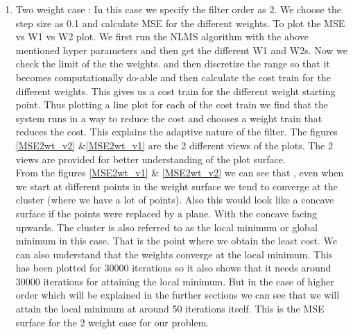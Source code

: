 \documentclass[conference]{IEEEtran}
\begin{document}
\begin{enumerate} 


\begin{figure*}
\centering
\texttt{[image: MSEPlotFor2WeightCase\_View1.jpg]}
\caption{MSE plot for 2 Weight Case View 1}
\label{MSE2wt_v1}
\end{figure*}

\begin{figure*}
\centering
\texttt{[image: MSEPlotFor2WeightCase\_View2.jpg]}
\caption{MSE plot for 2 Weight Case View 2}
\label{MSE2wt_v2}
\end{figure*}






\item Two weight case : In this case we specify the filter order as 2. We choose the step size as 0.1 and calculate MSE for the different weights.  To plot the MSE vs W1 vs W2 plot. We first run the NLMS algorithm with the above mentioned hyper parameters and then get the different W1 and W2s. Now we check the limit of the the weights. and then discretize the range so that it becomes computationally do-able and then calculate the cost train for the different weights. This gives us a cost train for the different weight starting point. Thus plotting a line plot for each of the cost train we find that the system runs in a way to reduce the cost and chooses a weight train that reduces the cost. This explains the adaptive nature of the filter.  The figures \ref{MSE2wt_v2} \&\ref{MSE2wt_v1} are the 2 different views of the plots. The 2 views are provided for better understanding of the plot surface. \\

From the figures \ref{MSE2wt_v1} \& \ref{MSE2wt_v2} we can see that , even when we start at different points in the weight surface we tend to converge at the cluster (where we have a lot of points). Also this would look like a concave surface if the points were replaced by a plane. With the concave facing upwards. The cluster is also referred to as the local minimum or global minimum in this case. That is the point where we obtain the least cost.  We can also understand that the weights converge at the local minimum. This has been plotted for 30000 iterations so it also shows that it needs around 30000 iterations for attaining the local minimum. But in the case of higher order which will be explained in the further sections we can see that we will attain the local minimum at around 50 iterations itself. This is the MSE surface for the 2 weight case for our problem. 


\end{enumerate}
\end{document}
